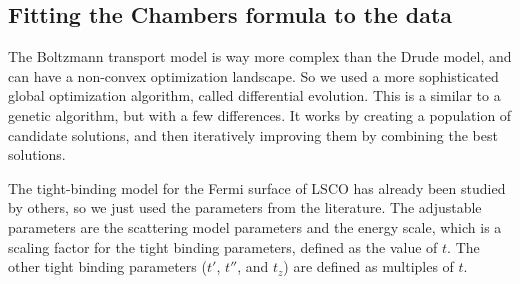 \subsection{Fitting the Chambers formula to the data}
The Boltzmann transport model is way more complex than the Drude model, and can have a non-convex
optimization landscape. So we used a more sophisticated global optimization algorithm, called
differential evolution. This is a similar to a genetic algorithm, but with a few differences. It
works by creating a population of candidate solutions, and then iteratively improving them by
combining the best solutions.

The tight-binding model for the Fermi surface of LSCO has already been studied by others, so we
just used the parameters from the literature. The adjustable parameters are the scattering model
parameters and the energy scale, which is a scaling factor for the tight binding parameters,
defined as the value of $t$. The other tight binding parameters ($t'$, $t''$, and $t_z$) are
defined as multiples of $t$.

